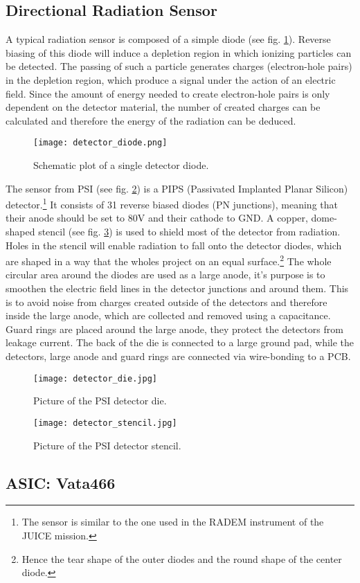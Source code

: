 \subsection{Directional Radiation Sensor}
\label{sec:radiation_sensor}
A typical radiation sensor is composed of a simple diode (see fig. \ref{fig:detector_diode}).
Reverse biasing of this diode will induce a depletion region in which ionizing particles can be detected.
The passing of such a particle generates charges (electron-hole pairs) in the depletion region, which produce a signal under the action of an electric field.
Since the amount of energy needed to create electron-hole pairs is only dependent on the detector material, the number of created charges can be calculated and therefore the energy of the radiation can be deduced.\cite{rossi2006pixel}

\begin{figure}[H]
    \centering
    \texttt{[image: detector\_diode.png]}
    \caption[Schematic Detector Diode]{Schematic plot of a single detector diode.\cite{am2016semiconductor}}
    \label{fig:detector_diode}
\end{figure}

The sensor from PSI (see fig. \ref{fig:detector_die}) is a PIPS (Passivated Implanted Planar Silicon) detector.\footnote{The sensor is similar to the one used in the RADEM instrument of the JUICE mission.}
It consists of 31 reverse biased diodes (PN junctions), meaning that their anode should be set to 80V and their cathode to GND.
A copper, dome-shaped stencil (see fig. \ref{fig:detector_stencil}) is used to shield most of the detector from radiation.
Holes in the stencil will enable radiation to fall onto the detector diodes, which are shaped in a way that the wholes project on an equal surface.\footnote{Hence the tear shape of the outer diodes and the round shape of the center diode.}
The whole circular area around the diodes are used as a large anode, it's purpose is to smoothen the electric field lines in the detector junctions and around them.
This is to avoid noise from charges created outside of the detectors and therefore inside the large anode, which are collected and removed using a capacitance.
Guard rings are placed around the large anode, they protect the detectors from leakage current.
The back of the die is connected to a large ground pad, while the detectors, large anode and guard rings are connected via wire-bonding to a PCB.

\begin{figure}[h!]
    \centering
    \texttt{[image: detector\_die.jpg]}
    \caption[PSI Detector Die]{Picture of the PSI detector die.}
    \label{fig:detector_die}
\end{figure}

\begin{figure}[h!]
    \centering
    \texttt{[image: detector\_stencil.jpg]}
    \caption[PSI Detector Stencil]{Picture of the PSI detector stencil.}
    \label{fig:detector_stencil}
\end{figure}


\subsection{ASIC: Vata466}
\label{sec:asic}

